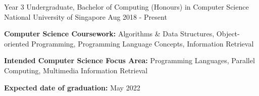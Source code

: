 

\begin{cventries}

  \cventry
    {Year 3 Undergraduate, Bachelor of Computing (Honours) in Computer Science} %
    {National University of Singapore} %
    {} %
    {Aug 2018 - Present} %
    {
      \begin{cvitems} %
        \item {\textbf{Computer Science Coursework:} Algorithms \& Data Structures, Object-oriented Programming, Programming Language Concepts, Information Retrieval}
        \item {\textbf{Intended Computer Science Focus Area:} Programming Languages, Parallel Computing, Multimedia Information Retrieval}
        \item {\textbf{Expected date of graduation:} May 2022}
      \end{cvitems}
    }

\end{cventries}
